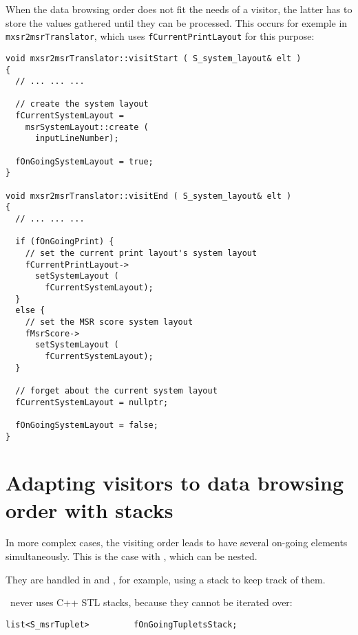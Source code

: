 When the data browsing order does not fit the needs of a visitor, the latter has to store the values gathered until they can be processed. This occurs for exemple in {\tt mxsr2msrTranslator}, which uses {\tt fCurrentPrintLayout} for this purpose:
\begin{lstlisting}[language=CPlusPlus]
void mxsr2msrTranslator::visitStart ( S_system_layout& elt )
{
  // ... ... ...

  // create the system layout
  fCurrentSystemLayout =
    msrSystemLayout::create (
      inputLineNumber);

  fOnGoingSystemLayout = true;
}

void mxsr2msrTranslator::visitEnd ( S_system_layout& elt )
{
  // ... ... ...

  if (fOnGoingPrint) {
    // set the current print layout's system layout
    fCurrentPrintLayout->
      setSystemLayout (
        fCurrentSystemLayout);
  }
  else {
    // set the MSR score system layout
    fMsrScore->
      setSystemLayout (
        fCurrentSystemLayout);
  }

  // forget about the current system layout
  fCurrentSystemLayout = nullptr;

  fOnGoingSystemLayout = false;
}
\end{lstlisting}


\section{Adapting visitors to data browsing order with stacks}

In more complex cases, the visiting order leads to have several on-going elements simultaneously. This is the case with , which can be nested.

They are handled in  and , for example, using a stack to keep track of them.

\mf\ never uses C++ STL stacks, because they cannot be iterated over:
\begin{lstlisting}[language=CPlusPlus]
    list<S_msrTuplet>         fOnGoingTupletsStack;
\end{lstlisting}

